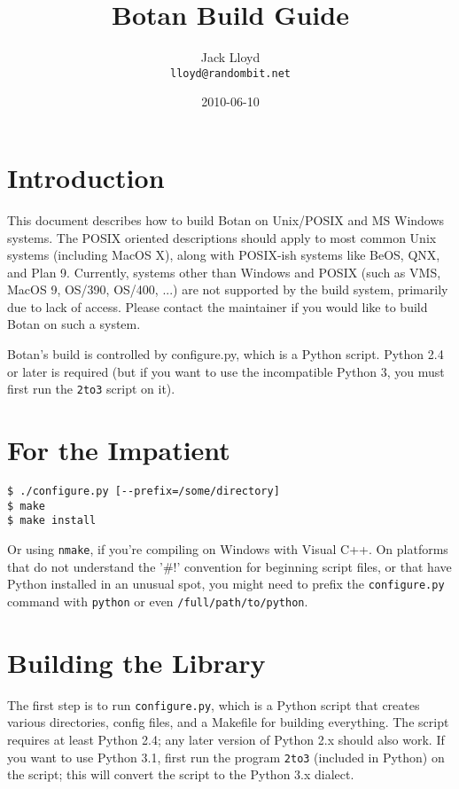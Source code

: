 \documentclass{article}
\title{\textbf{Botan Build Guide}}
\author{Jack Lloyd \\
        \texttt{lloyd@randombit.net}}
\date{2010-06-10}
\newcommand{\filename}[1]{\texttt{#1}}
\begin{document}
\maketitle

\tableofcontents

\parskip=5pt
\pagebreak

\section{Introduction}

This document describes how to build Botan on Unix/POSIX and MS
Windows systems. The POSIX oriented descriptions should apply to most
common Unix systems (including MacOS X), along with POSIX-ish systems
like BeOS, QNX, and Plan 9. Currently, systems other than Windows and
POSIX (such as VMS, MacOS 9, OS/390, OS/400, ...) are not supported by
the build system, primarily due to lack of access. Please contact the
maintainer if you would like to build Botan on such a system.

Botan's build is controlled by configure.py, which is a Python
script. Python 2.4 or later is required (but if you want to use the
incompatible Python 3, you must first run the \texttt{2to3} script on
it).

\section{For the Impatient}

\begin{verbatim}
$ ./configure.py [--prefix=/some/directory]
$ make
$ make install
\end{verbatim}

Or using \verb|nmake|, if you're compiling on Windows with Visual
C++. On platforms that do not understand the '\#!' convention for
beginning script files, or that have Python installed in an unusual
spot, you might need to prefix the \texttt{configure.py} command with
\texttt{python} or even \texttt{/full/path/to/python}.

\section{Building the Library}

The first step is to run \filename{configure.py}, which is a Python
script that creates various directories, config files, and a Makefile
for building everything. The script requires at least Python 2.4; any
later version of Python 2.x should also work. If you want to use
Python 3.1, first run the program \texttt{2to3} (included in Python)
on the script; this will convert the script to the Python 3.x dialect.
\end{document}
